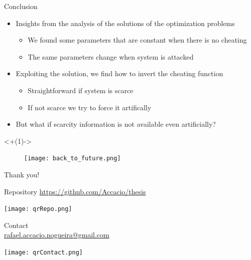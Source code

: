 \documentclass[aspectratio=169]{beamer}
\begin{document}
\begin{frame}{Conclusion}{}
  \begin{itemize}[<+(1)->]
    \item Insights from the analysis of the solutions of the optimization problems
          \begin{itemize}
            \item We found some parameters that are constant when there is no cheating
            \item The same parameters change when system is attacked
          \end{itemize}

    \item Exploiting the solution, we find how to invert the cheating function
          \begin{itemize}
            \item Straightforward if system is scarce
            \item If not scarce we try to force it artifically
          \end{itemize}
  \end{itemize}

  \begin{itemize}[<+(1)->]
    \item But what if scarcity information is not available even artificially?
  \end{itemize}

  \visible<+(1)->{
  \begin{figure}[h]
    \centering
    \texttt{[image: back\_to\_future.png]}
  \end{figure}
  }
\end{frame}


\appendix

\begin{frame}[plain]
  \centering
  \vfill
  Thank you!
  \vfill
  \begin{minipage}[t]{.45\linewidth}
    \small
    \centering
    Repository
    \href{https://github.com/Accacio/thesis}{https://github.com/Accacio/thesis}

    \texttt{[image: qrRepo.png]}
  \end{minipage}
  \hfill
  \begin{minipage}[t]{.5\linewidth}
    \small
    \centering
    Contact\\
    \href{mailto:rafael.accacio.nogueira@gmail.com?subject=Thesis Defense Presentation}{rafael.accacio.nogueira@gmail.com}

    \texttt{[image: qrContact.png]}
  \end{minipage}
  \fi

\end{frame}
\end{document}
